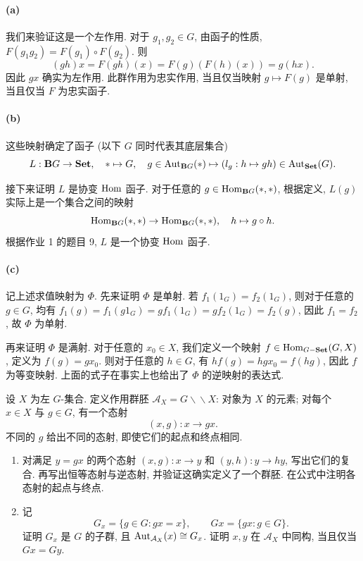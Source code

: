 \documentclass{article}
\begin{document}
\begin{solution}
	\paragraph{(a)} 我们来验证这是一个左作用. 对于 $g_1, g_2 \in G$, 由函子的性质, $F(g_1g_2) = F(g_1) \circ F(g_2)$. 则
	\[ (gh) x = F(gh)(x) = F(g)(F(h)(x)) = g(hx). \]
	因此 $gx$ 确实为左作用. 此群作用为忠实作用, 当且仅当映射 $g \mapsto F(g)$ 是单射, 当且仅当 $F$ 为忠实函子.

	\paragraph{(b)} 这些映射确定了函子 (以下 $G$ 同时代表其底层集合)
	\[ L: \mathbf{B}G \to \mathbf{Set}, \quad 
	* \mapsto G, \quad 
	g \in \operatorname{Aut}_{\mathbf{B}G}(*) \mapsto (l_g: h \mapsto gh) \in \operatorname{Aut}_{\mathbf{Set}}(G).  \]

	接下来证明 $L$ 是协变 $\operatorname{Hom}$ 函子. 对于任意的 $g \in \operatorname{Hom}_{\mathbf{B}G}(*,*)$, 根据定义, $L(g)$ 实际上是一个集合之间的映射
	\[ \operatorname{Hom}_{\mathbf{B}G}(*,*) \to \operatorname{Hom}_{\mathbf{B}G}(*,*), \quad h \mapsto g \circ h. \]
	根据作业 1 的题目 9, $L$ 是一个协变 $\operatorname{Hom}$ 函子. 

	\paragraph{(c)} 记上述求值映射为 $\Phi$. 先来证明 $\Phi$ 是单射. 若 $f_1(1_G) = f_2(1_G)$, 则对于任意的 $g \in G$, 均有 $f_1(g) = f_1 (g1_G) = gf_1(1_G) = gf_2(1_G) = f_2 (g)$, 因此 $f_1 = f_2$, 故 $\Phi$ 为单射.

	再来证明 $\Phi$ 是满射. 对于任意的 $x_0 \in X$, 我们定义一个映射 $f \in \operatorname{Hom}_{G-\mathbf{Set}}(G,X)$, 定义为 $f(g) = gx_0$. 则对于任意的 $h \in G$, 有 $hf(g) = hgx_0 = f(hg)$, 因此 $f$ 为等变映射. 上面的式子在事实上也给出了 $\Phi$ 的逆映射的表达式.
\end{solution}



\begin{problem}
  设 $X$ 为左 $G$-集合. 定义作用群胚 $\mathcal A_X=G\backslash\!\backslash X$: 对象为 $X$ 的元素; 对每个 $x\in X$ 与 $g\in G$, 有一个态射
  \[
    (x,g):x\longrightarrow gx.
  \]
  不同的 $g$ 给出不同的态射, 即使它们的起点和终点相同.
  \begin{enumerate}
    \item[(a)] 对满足 $y=gx$ 的两个态射 $(x,g):x\to y$ 和 $(y,h):y\to hy$, 写出它们的复合. 再写出恒等态射与逆态射, 并验证这确实定义了一个群胚. 在公式中注明各态射的起点与终点.
    \item[(b)] 记
      \[
        G_x=\{g\in G:gx=x\},\qquad Gx=\{gx:g\in G\}.
      \]
      证明 $G_x$ 是 $G$ 的子群, 且 $\operatorname{Aut}_{\mathcal A_X}(x)\cong G_x$. 证明 $x,y$ 在 $\mathcal A_X$ 中同构, 当且仅当 $Gx=Gy$.
  \end{enumerate}
\end{problem}
\end{document}
